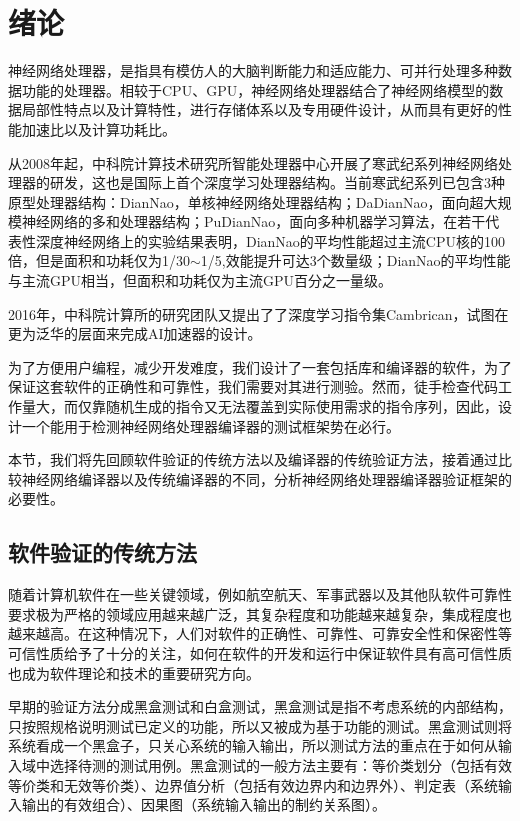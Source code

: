 ﻿\chapter{绪论}
神经网络处理器，是指具有模仿人的大脑判断能力和适应能力、可并行处理多种数据功能的处理器。相较于CPU、GPU，神经网络处理器结合了神经网络模型的数据局部性特点以及计算特性，进行存储体系以及专用硬件设计，从而具有更好的性能加速比以及计算功耗比。

从2008年起，中科院计算技术研究所智能处理器中心开展了寒武纪系列神经网络处理器的研发，这也是国际上首个深度学习处理器结构。当前寒武纪系列已包含3种原型处理器结构：DianNao，单核神经网络处理器结构；DaDianNao，面向超大规模神经网络的多和处理器结构；PuDianNao，面向多种机器学习算法，在若干代表性深度神经网络上的实验结果表明，DianNao的平均性能超过主流CPU核的100倍，但是面积和功耗仅为1/30$\sim$1/5,效能提升可达3个数量级；DianNao的平均性能与主流GPU相当，但面积和功耗仅为主流GPU百分之一量级。

2016年，中科院计算所的研究团队又提出了了深度学习指令集Cambrican，试图在更为泛华的层面来完成AI加速器的设计。

为了方便用户编程，减少开发难度，我们设计了一套包括库和编译器的软件，为了保证这套软件的正确性和可靠性，我们需要对其进行测验。然而，徒手检查代码工作量大，而仅靠随机生成的指令又无法覆盖到实际使用需求的指令序列，因此，设计一个能用于检测神经网络处理器编译器的测试框架势在必行。

本节，我们将先回顾软件验证的传统方法以及编译器的传统验证方法，接着通过比较神经网络编译器以及传统编译器的不同，分析神经网络处理器编译器验证框架的必要性。

\section{软件验证的传统方法}
随着计算机软件在一些关键领域，例如航空航天、军事武器以及其他队软件可靠性要求极为严格的领域应用越来越广泛，其复杂程度和功能越来越复杂，集成程度也越来越高。在这种情况下，人们对软件的正确性、可靠性、可靠安全性和保密性等可信性质给予了十分的关注，如何在软件的开发和运行中保证软件具有高可信性质也成为软件理论和技术的重要研究方向。

早期的验证方法分成黑盒测试和白盒测试，黑盒测试是指不考虑系统的内部结构，只按照规格说明测试已定义的功能，所以又被成为基于功能的测试。黑盒测试则将系统看成一个黑盒子，只关心系统的输入输出，所以测试方法的重点在于如何从输入域中选择待测的测试用例。黑盒测试的一般方法主要有：等价类划分（包括有效等价类和无效等价类）、边界值分析（包括有效边界内和边界外）、判定表（系统输入输出的有效组合）、因果图（系统输入输出的制约关系图）。

